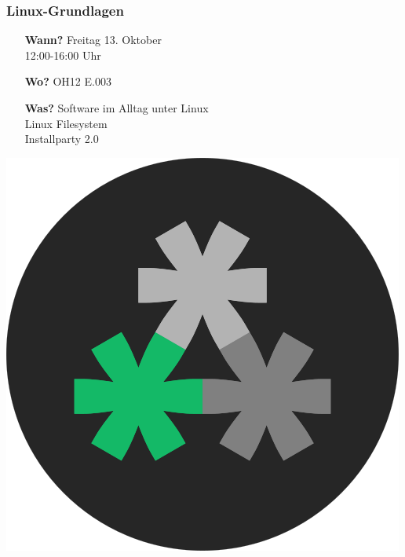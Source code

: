 \documentclass[12pt,utf8]{beamer}
\begin{document}
	\begin{frame}
		\frametitle{Linux-Grundlagen}
			\vspace*{0.5cm}
			\begin{minipage}{0.6\linewidth}
				\begin{itemize}
					\item [\textbf{Wann?}]Freitag 13. Oktober\\12:00-16:00 Uhr\newline
					\item [\textbf{Wo?}]OH12 E.003\newline
					\item [\textbf{Was?}]Software im Alltag unter Linux\\Linux Filesystem\\Installparty 2.0
				\end{itemize}
			\end{minipage}
			\begin{minipage}{0.35\linewidth}
				\hspace*{1.5cm}
				\vspace*{-5cm}
				\includegraphics[scale=0.2]{logo_500px.png}
			\end{minipage}
	\end{frame}
\end{document}

